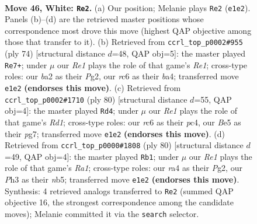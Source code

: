 \documentclass[11pt]{article}
\begin{document}
\clearpage

\begin{figure}[p]\centering
\begin{subfigure}{0.46\textwidth}\centering
\resizebox{\linewidth}{!}{%
\newchessgame
\chessboard[
  setfen={5k2/3R4/2r5/1p2B1p1/rn6/4P1PP/b4P2/4R1K1 w - - 1 46},
  showmover=false,
  pgfstyle=straightmove, color=movearrow, markmove={e1-e2}
]}
\caption{}
\end{subfigure}\hfill
\begin{subfigure}{0.46\textwidth}\centering
\resizebox{\linewidth}{!}{%
\newchessgame
\chessboard[
  setfen={rr6/6k1/3P4/2p2p1p/b1B5/N6P/5PP1/4R1K1 w - - 0 38},
  showmover=false,
  pgfstyle=straightmove, color=movearrow, markmove={e1-e7}
]}
\caption{}
\end{subfigure}
\\[4pt]
\begin{subfigure}{0.46\textwidth}\centering
\resizebox{\linewidth}{!}{%
\newchessgame
\chessboard[
  setfen={3r2k1/3n2p1/p2P3p/8/1Pp4b/P7/4R2P/1K1R4 w - - 0 41},
  showmover=false,
  pgfstyle=straightmove, color=movearrow, markmove={d1-d4}
]}
\caption{}
\end{subfigure}\hfill
\begin{subfigure}{0.46\textwidth}\centering
\resizebox{\linewidth}{!}{%
\newchessgame
\chessboard[
  setfen={8/1r4k1/2Nbp2p/1n3p1B/8/4P3/5PP1/R5K1 w - - 3 41},
  showmover=false,
  pgfstyle=straightmove, color=movearrow, markmove={a1-b1}
]}
\caption{}
\end{subfigure}
\caption{\textbf{Move 46, White: \texttt{Re2}.} (a) Our position; Melanie plays \texttt{Re2} (\texttt{e1e2}). Panels (b)--(d) are the retrieved master positions whose correspondence most drove this move (highest QAP objective among those that transfer to it). (b) Retrieved from \texttt{ccrl\_top\_p0002\#955} (ply 74) [structural distance $d$=48, QAP obj=5]: the master played \texttt{Re7+}; under $\mu$ our \emph{Re1} plays the role of that game's \emph{Re1}; cross-type roles: our \emph{b}a2 as their \emph{P}g2, our \emph{r}c6 as their \emph{b}a4; transferred move \texttt{e1e2} \textbf{(endorses this move)}. (c) Retrieved from \texttt{ccrl\_top\_p0002\#1710} (ply 80) [structural distance $d$=55, QAP obj=4]: the master played \texttt{Rd4}; under $\mu$ our \emph{Re1} plays the role of that game's \emph{Rd1}; cross-type roles: our \emph{r}c6 as their \emph{p}c4, our \emph{B}e5 as their \emph{p}g7; transferred move \texttt{e1e2} \textbf{(endorses this move)}. (d) Retrieved from \texttt{ccrl\_top\_p0000\#1808} (ply 80) [structural distance $d$=49, QAP obj=4]: the master played \texttt{Rb1}; under $\mu$ our \emph{Re1} plays the role of that game's \emph{Ra1}; cross-type roles: our \emph{r}a4 as their \emph{P}g2, our \emph{P}h3 as their \emph{n}b5; transferred move \texttt{e1e2} \textbf{(endorses this move)}. Synthesis: 4 retrieved analogs transferred to \texttt{Re2} (summed QAP objective 16, the strongest correspondence among the candidate moves); Melanie committed it via the \texttt{search} selector.}
\label{fig:thought-m90}
\end{figure}
\end{document}
